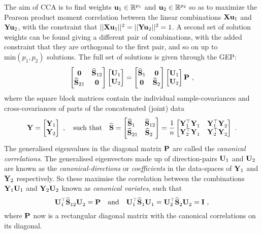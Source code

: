     The aim of CCA is to find weights $\mathbf{u}_1 \in \mathbb{R}^{p_1}$ and $\mathbf{u}_2 \in \mathbb{R}^{p_2}$ so as to maximize the Pearson product moment correlation between the linear combinations $\mathbf{X}\mathbf{u}_1$ and $\mathbf{Y}\mathbf{u}_2$, with the constraint that $ \vert\vert \mathbf{X}\mathbf{u}_1 \vert\vert^2 = \vert\vert \mathbf{Y}\mathbf{u}_2 \vert\vert^2 = 1$. A second set of solution weights can be found giving a different pair of combinations, with the added constraint that they are orthogonal to the first pair, and so on up to $\textrm{min}(p_1,p_2)$ solutions. The full set of solutions is given through the GEP: %
    \begin{equation} \label{equ:chap4_ccaeigenproblem}
	\begin{bmatrix}  \mathbf{0} & \widehat{\mathbf{S}}_{12} \\ \widehat{\mathbf{S}}_{21} & \mathbf{0}  \end{bmatrix} \begin{bmatrix}  \mathbf{U}_1 \\ \mathbf{U}_2  \end{bmatrix}
	= \begin{bmatrix}  \widehat{\mathbf{S}}_1 &\mathbf{0} \\ \mathbf{0} &\widehat{\mathbf{S}}_2  \end{bmatrix} \begin{bmatrix}  \mathbf{U}_1 \\ \mathbf{U}_2  \end{bmatrix} \mathbf{P} ~,
    \end{equation}
    where the square block matrices contain the individual sample-covariances and cross-covariances of parts of the concatenated (joint) data
      \[
	\mathbf{Y} = \begin{bmatrix}  \mathbf{Y}_1 \\ \mathbf{Y}_2  \end{bmatrix} ~,
	\quad \textrm{such that} \quad \widehat{\mathbf{S}}
	= \begin{bmatrix}  \widehat{\mathbf{S}}_{1~} & \widehat{\mathbf{S}}_{12} \\ \widehat{\mathbf{S}}_{21} & \widehat{\mathbf{S}}_{2~}  \end{bmatrix}
	= \frac{1}{n}\begin{bmatrix}  \mathbf{Y}_1^\top \mathbf{Y}_1^{~} & \mathbf{Y}_1^\top \mathbf{Y}_2^{~} \\ \mathbf{Y}_2^\top \mathbf{Y}_1^{~} & \mathbf{Y}_2^\top \mathbf{Y}_2^{~}  \end{bmatrix} ~.
      \]
      The generalised eigenvalues in the diagonal matrix $\mathbf{P}$ are called the \emph{canonical correlations}. The generalised eigenvectors made up of direction-pairs $\mathbf{U}_1$ and $\mathbf{U}_2$ are known as the \textit{canonical-directions} or \textit{coefficients} in the data-spaces of $\mathbf{Y}_1$ and $\mathbf{Y}_2$ respectively. So these maximise the correlation between the combinations $\mathbf{Y}_1\mathbf{U}_1$ and $\mathbf{Y}_2\mathbf{U}_2$ known as \textit{canonical variates}, such that
      \[
	\mathbf{U}_1^\top\widehat{\mathbf{S}}_{12}^{~}\mathbf{U}_2^{~} = \mathbf{P}
	\quad \textrm{and} \quad
	\mathbf{U}_1^\top\widehat{\mathbf{S}}_1^{~} \mathbf{U}_1^{~} = \mathbf{U}_2^\top \widehat{\mathbf{S}}_2^{~} \mathbf{U}_2^{~} = \mathbf{I} ~,
      \]
      where $\mathbf{P}$ now is a rectangular diagonal matrix with the canonical correlations on its diagonal.

